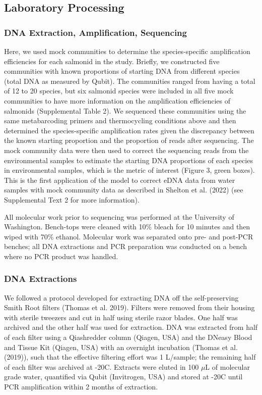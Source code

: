\documentclass[
]{article}
\begin{document}
\hypertarget{laboratory-processing}{%
\subsection{Laboratory Processing}\label{laboratory-processing}}

\hypertarget{dna-extraction-amplification-sequencing}{%
\subsubsection{DNA Extraction, Amplification,
Sequencing}\label{dna-extraction-amplification-sequencing}}

Here, we used mock communities to determine the species-specific
amplification efficiencies for each salmonid in the study. Briefly, we
constructed five communities with known proportions of starting DNA from
different species (total DNA as measured by Qubit). The communities
ranged from having a total of 12 to 20 species, but six salmonid species
were included in all five mock communities to have more information on
the amplification efficiencies of salmonids (Supplemental Table 2). We
sequenced these communities using the same metabarcoding primers and
thermocycling conditions above and then determined the species-specific
amplification rates given the discrepancy between the known starting
proportion and the proportion of reads after sequencing. The mock
community data were then used to correct the sequencing reads from the
environmental samples to estimate the starting DNA proportions of each
species in environmental samples, which is the metric of interest
(Figure 3, green boxes). This is the first application of the model to
correct eDNA data from water samples with mock community data as
described in Shelton et al. (2022) (see Supplemental Text 2 for more
information).

All molecular work prior to sequencing was performed at the University
of Washington. Bench-tops were cleaned with 10\% bleach for 10 minutes
and then wiped with 70\% ethanol. Molecular work was separated onto pre-
and post-PCR benches; all DNA extractions and PCR preparation was
conducted on a bench where no PCR product was handled.

\hypertarget{dna-extractions}{%
\subsubsection{DNA Extractions}\label{dna-extractions}}

We followed a protocol developed for extracting DNA off the
self-preserving Smith Root filters (Thomas et al. 2019). Filters were
removed from their housing with sterile tweezers and cut in half using
sterile razor blades. One half was archived and the other half was used
for extraction. DNA was extracted from half of each filter using a
Qiashredder column (Qiagen, USA) and the DNeasy Blood and Tissue Kit
(Qiagen, USA) with an overnight incubation (Thomas et al. (2019)), such
that the effective filtering effort was 1 L/sample; the remaining half
of each filter was archived at -20\degree C. Extracts were eluted in 100
\(\mu\)L of molecular grade water, quantified via Qubit (Invitrogen,
USA) and stored at -20\degree C until PCR amplification within 2 months
of extraction.
\end{document}
